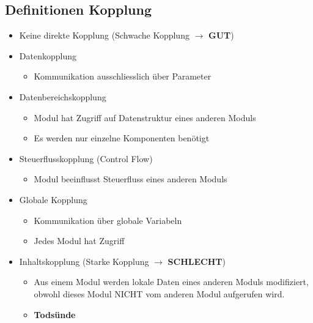 \begin{multicols}{2}
\subsection{Definitionen Kopplung}
\begin{itemize}
  \item Keine direkte Kopplung (Schwache Kopplung $\rightarrow$ \textbf{GUT})
  \item Datenkopplung
  \begin{itemize}
    \item Kommunikation ausschliesslich über Parameter
  \end{itemize}
  \item Datenbereichskopplung
   \begin{itemize}
    \item Modul hat Zugriff auf Datenstruktur eines anderen Moduls
    \item Es werden nur einzelne Komponenten benötigt
  \end{itemize}
  \item Steuerflusskopplung (Control Flow)
  \begin{itemize}
    \item Modul beeinflusst Steuerfluss eines anderen Moduls
  \end{itemize}
  \item Globale Kopplung
  \begin{itemize}
    \item Kommunikation über globale Variabeln
    \item Jedes Modul hat Zugriff
  \end{itemize}
  \item Inhaltskopplung (Starke Kopplung $\rightarrow$ \textbf{SCHLECHT})
  \begin{itemize}
    \item Aus einem Modul werden lokale Daten eines anderen Moduls modifiziert,
    obwohl dieses Modul NICHT vom anderen Modul aufgerufen wird.
    \item \textbf{Todsünde}
  \end{itemize}
\end{itemize}
\columnbreak

\end{multicols}
